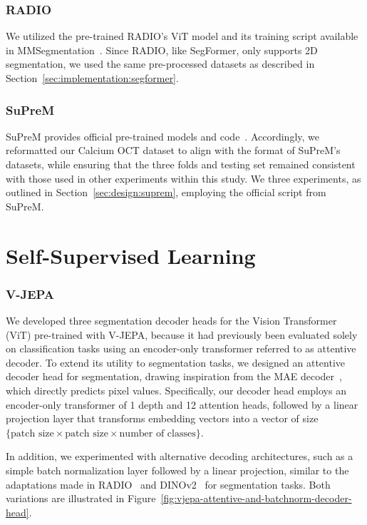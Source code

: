\documentclass[a4paper,11pt,oneside]{report}
\begin{document}
\subsubsection{RADIO}
We utilized the pre-trained RADIO's ViT model and its training script available in MMSegmentation~\cite{mmseg2020}. Since RADIO, like SegFormer, only supports 2D segmentation, we used the same pre-processed datasets as described in Section~\ref{sec:implementation:segformer}.

\subsubsection{SuPreM}
SuPreM provides official pre-trained models and code~\cite{Li2024}. Accordingly, we reformatted our Calcium OCT dataset to align with the format of SuPreM's datasets, while ensuring that the three folds and testing set remained consistent with those used in other experiments within this study. We three experiments, as outlined in Section~\ref{sec:design:suprem}, employing the official script from SuPreM.

\section{Self-Supervised Learning}
\subsubsection{V-JEPA}\label{sec:implementation:vjepa}
We developed three segmentation decoder heads for the Vision Transformer (ViT) pre-trained with V-JEPA, because it had previously been evaluated solely on classification tasks using an encoder-only transformer referred to as attentive decoder. To extend its utility to segmentation tasks, we designed an attentive decoder head for segmentation, drawing inspiration from the MAE decoder~\cite{He2022}, which directly predicts pixel values. Specifically, our decoder head employs an encoder-only transformer of 1 depth and 12 attention heads, followed by a linear projection layer that transforms embedding vectors into a vector of size \(\{\text{patch size} \times \text{patch size} \times \text{number of classes}\}\). 

In addition, we experimented with alternative decoding architectures, such as a simple batch normalization layer followed by a linear projection, similar to the adaptations made in RADIO~\cite{Ranzinger2024RADIO} and DINOv2~\cite{Oquab2024dinov} for segmentation tasks. Both variations are illustrated in Figure~\ref{fig:vjepa-attentive-and-batchnorm-decoder-head}. 
\end{document}
